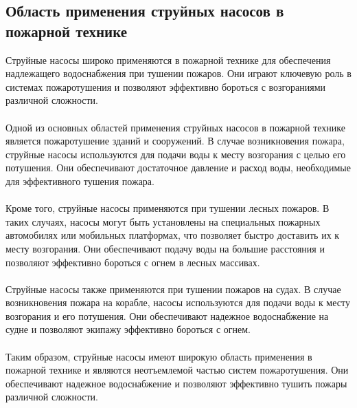 \documentclass{article}
\begin{document}
\subsection{Область применения струйных насосов в пожарной технике}
Струйные насосы широко применяются в пожарной технике для обеспечения надлежащего водоснабжения при тушении пожаров. Они играют ключевую роль в системах пожаротушения и позволяют эффективно бороться с возгораниями различной сложности.\\
~\\
Одной из основных областей применения струйных насосов в пожарной технике является пожаротушение зданий и сооружений. В случае возникновения пожара, струйные насосы используются для подачи воды к месту возгорания с целью его потушения. Они обеспечивают достаточное давление и расход воды, необходимые для эффективного тушения пожара.\\
~\\
Кроме того, струйные насосы применяются при тушении лесных пожаров. В таких случаях, насосы могут быть установлены на специальных пожарных автомобилях или мобильных платформах, что позволяет быстро доставить их к месту возгорания. Они обеспечивают подачу воды на большие расстояния и позволяют эффективно бороться с огнем в лесных массивах.\\
~\\
Струйные насосы также применяются при тушении пожаров на судах. В случае возникновения пожара на корабле, насосы используются для подачи воды к месту возгорания и его потушения. Они обеспечивают надежное водоснабжение на судне и позволяют экипажу эффективно бороться с огнем.\\
~\\
Таким образом, струйные насосы имеют широкую область применения в пожарной технике и являются неотъемлемой частью систем пожаротушения. Они обеспечивают надежное водоснабжение и позволяют эффективно тушить пожары различной сложности.\\
~\\

\newpage
\end{document}
